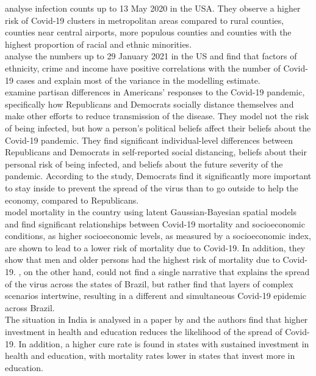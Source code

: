 \cite{maiti2021exploring} analyse infection counts up to 13 May 2020 in the USA. They observe a higher risk of Covid-19 clusters in metropolitan areas compared to rural counties, counties near central airports, more populous counties and counties with the highest proportion of racial and ethnic minorities. \\
\cite{wang2021spatiotemporal} analyse the numbers up to 29 January 2021 in the US and find that factors of ethnicity, crime and income have positive correlations with the number of Covid-19 cases and explain most of the variance in the modelling estimate. \\
\cite{allcott2020polarization} examine partisan differences in Americans' responses to the Covid-19 pandemic, specifically how Republicans and Democrats socially distance themselves and make other efforts to reduce transmission of the disease. They model not the risk of being infected, but how a person's political beliefs affect their beliefs about the Covid-19 pandemic. They find significant individual-level differences between Republicans and Democrats in self-reported social distancing, beliefs about their personal risk of being infected, and beliefs about the future severity of the pandemic. According to the study, Democrats find it significantly more important to stay inside to prevent the spread of the virus than to go outside to help the economy, compared to Republicans. \\
\cite{bermudi2021spatiotemporal} model mortality in the country using latent Gaussian-Bayesian spatial models and find significant relationships between Covid-19 mortality and socioeconomic conditions, as higher socioeconomic levels, as measured by a socioeconomic index, are shown to lead to a lower risk of mortality due to Covid-19. In addition, they show that men and older persons had the highest risk of mortality due to Covid-19. \cite{castro2021spatiotemporal}, on the other hand, could not find a single narrative that explains the spread of the virus across the states of Brazil, but rather find that layers of complex scenarios intertwine, resulting in a different and simultaneous Covid-19 epidemic across Brazil. \\
The situation in India is analysed in a paper by \cite{nandy2021managing} and the authors find that higher investment in health and education reduces the likelihood of the spread of Covid-19. In addition, a higher cure rate is found in states with sustained investment in health and education, with mortality rates lower in states that invest more in education. \\
